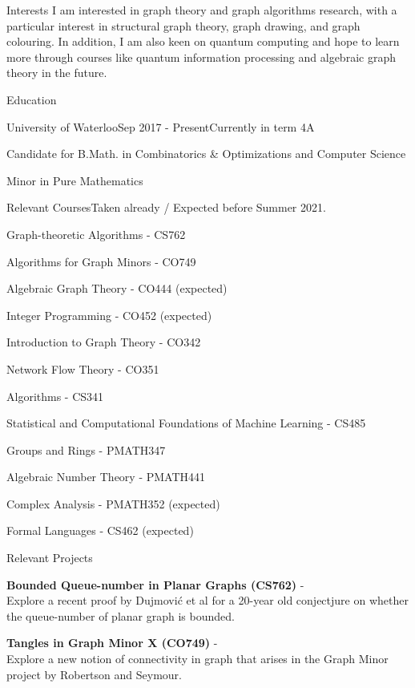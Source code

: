 \documentclass{cv}
\begin{document}
\begin{rSection}{Interests}
I am interested in graph theory and graph algorithms research, with a particular interest in structural graph theory, graph drawing, and graph colouring. In addition, I am also keen on quantum computing and hope to learn more through courses like quantum information processing and algebraic graph theory in the future.
\end{rSection}

\begin{rSection}{Education}
\begin{rSubsection}{University of Waterloo}{Sep 2017 - Present}{Currently in term 4A}{}
	\item Candidate for B.Math. in Combinatorics \& Optimizations and Computer Science
	\item Minor in Pure Mathematics
\end{rSubsection}

\begin{rSubsection}{Relevant Courses}{}{Taken already / Expected before Summer 2021.
}{}
	\item Graph-theoretic Algorithms - CS762
	\item Algorithms for Graph Minors - CO749
	\item Algebraic Graph Theory - CO444 (expected)
	\item Integer Programming - CO452 (expected)
	\item Introduction to Graph Theory - CO342
	\item Network Flow Theory - CO351
	\item Algorithms - CS341
	\item Statistical and Computational Foundations of Machine Learning - CS485
	\item Groups and Rings - PMATH347
	\item Algebraic Number Theory - PMATH441
	\item Complex Analysis - PMATH352 (expected)
	\item Formal Languages - CS462 (expected)
\end{rSubsection}

\begin{rSubsection}{Relevant Projects}{}{}{}
	\item \textbf{Bounded Queue-number in Planar Graphs (CS762)} - \\
	Explore a recent proof by Dujmovi\'{c} et al for a 20-year old conjectjure on whether the queue-number of planar graph is bounded. 
	\item \textbf{Tangles in Graph Minor X (CO749)} - \\
	Explore a new notion of connectivity in graph that arises in the Graph Minor project by Robertson and Seymour. 
\end{rSubsection}
\end{rSection}
\end{document}

